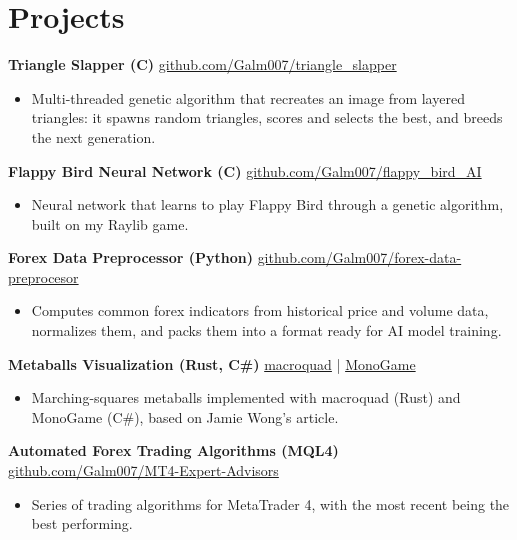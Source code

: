 \documentclass[10pt,letterpaper]{article}
\newcommand{\project}[2]{%
  \textbf{#1} \hfill {\small #2}\par}
\begin{document}
\section{Projects}
\project{Triangle Slapper (C)}{\href{https://github.com/Galm007/triangle_slapper}{github.com/Galm007/triangle\_slapper}}
\begin{itemize}
  \item Multi-threaded genetic algorithm that recreates an image from layered triangles: it spawns random triangles, scores and selects the best, and breeds the next generation.
\end{itemize}
\vspace{3pt}
\project{Flappy Bird Neural Network (C)}{\href{https://github.com/Galm007/flappy_bird_AI}{github.com/Galm007/flappy\_bird\_AI}}
\begin{itemize}
  \item Neural network that learns to play Flappy Bird through a genetic algorithm, built on my Raylib game.
\end{itemize}
\vspace{3pt}
\project{Forex Data Preprocessor (Python)}{\href{https://github.com/Galm007/forex-data-preprocesor}{github.com/Galm007/forex-data-preprocesor}}
\begin{itemize}
  \item Computes common forex indicators from historical price and volume data, normalizes them, and packs them into a format ready for AI model training.
\end{itemize}
\vspace{3pt}
\project{Metaballs Visualization (Rust, C\#)}{\href{https://github.com/Galm007/metaballs_macroquad}{macroquad} | \href{https://github.com/Galm007/MetaBalls}{MonoGame}}
\begin{itemize}
  \item Marching-squares metaballs implemented with macroquad (Rust) and MonoGame (C\#), based on Jamie Wong's article.
\end{itemize}
\vspace{3pt}
\project{Automated Forex Trading Algorithms (MQL4)}{\href{https://github.com/Galm007/MT4-Expert-Advisors}{github.com/Galm007/MT4-Expert-Advisors}}
\begin{itemize}
  \item Series of trading algorithms for MetaTrader 4, with the most recent being the best performing.
\end{itemize}

\end{document}
